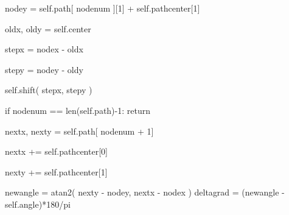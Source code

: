 \documentclass[14pt, oneside]{SavkinSeliverstov}
\begin{document}
		node\underline{\hspace{0.2cm}}y = self.path[ node\underline{\hspace{0.2cm}}num ][1] + self.path\underline{\hspace{0.2cm}}center[1]
		
		old\underline{\hspace{0.2cm}}x, old\underline{\hspace{0.2cm}}y = self.center
				
		step\underline{\hspace{0.2cm}}x = node\underline{\hspace{0.2cm}}x - old\underline{\hspace{0.2cm}}x
		
		step\underline{\hspace{0.2cm}}y = node\underline{\hspace{0.2cm}}y - old\underline{\hspace{0.2cm}}y
		
		self.shift( step\underline{\hspace{0.2cm}}x, step\underline{\hspace{0.2cm}}y )
		
		if node\underline{\hspace{0.2cm}}num == len(self.path)-1:  return
		
		next\underline{\hspace{0.2cm}}x, next\underline{\hspace{0.2cm}}y = self.path[ node\underline{\hspace{0.2cm}}num + 1]
		
		next\underline{\hspace{0.2cm}}x += self.path\underline{\hspace{0.2cm}}center[0]
		
		next\underline{\hspace{0.2cm}}y += self.path\underline{\hspace{0.2cm}}center[1]

		new\underline{\hspace{0.2cm}}angle = atan2( next\underline{\hspace{0.2cm}}y -
		node\underline{\hspace{0.2cm}}y, next\underline{\hspace{0.2cm}}x - node\underline{\hspace{0.2cm}}x )
		delta\underline{\hspace{0.2cm}}grad = (new\underline{\hspace{0.2cm}}angle - self.angle)*180/pi
		
\end{document}

